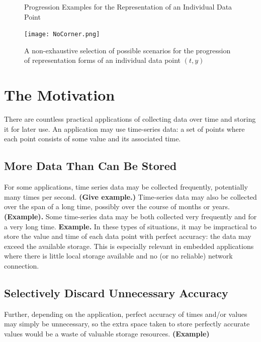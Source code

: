 \documentclass{article}
\begin{document}
\begin{figure}
    \centering
    \caption*{Progression Examples for the Representation of an Individual Data Point}
    \texttt{[image: NoCorner.png]}
    \caption{A non-exhaustive selection of possible scenarios for the progression of representation forms of an individual data point \((t,y)\)}
    \label{fig:does_not_create_a_corner}
\end{figure}


\newpage
\newpage
\mbox{} %



\section{The Motivation}
\label{sec:the_motivation}
There are countless practical applications of collecting data over time and storing it for later use. An application may use time-series data: a set of points where each point consists of some value and its associated time.

\subsection{More Data Than Can Be Stored}
\label{subsec:practical_applications}
For some applications, time series data may be collected frequently, potentially many times per second. \textbf{(Give example.) } Time-series data may also be collected over the span of a long time, possibly over the course of months or years. \textbf{(Example). } Some time-series data may be both collected very frequently and for a very long time. \textbf{Example.} In these types of situations, it may be impractical to store the value and time of each data point with perfect accuracy: the data may exceed the available storage. This is especially relevant in embedded applications where there is little local storage available and no (or no reliable) network connection.

\subsection{Selectively Discard Unnecessary Accuracy}
\label{subsec:unnecessary_accuracy}
Further, depending on the application, perfect accuracy of times and/or values may simply be unnecessary, so the extra space taken to store perfectly accurate values would be a waste of valuable storage resources. \textbf{(Example)}
\end{document}
